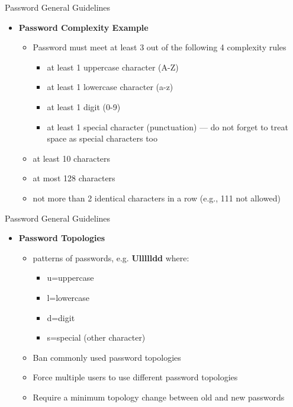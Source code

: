 \documentclass[pdf]{beamer}
\begin{document}
\begin{frame}{Password General Guidelines}
\begin{itemize}
\item
\textbf{Password Complexity Example}
\begin{itemize}
\item
Password must meet at least 3 out of the following 4 complexity rules 

\begin{itemize}
\item
at least 1 uppercase character (A-Z) 
\item
at least 1 lowercase character (a-z) 
\item
at least 1 digit (0-9) 
\item
at least 1 special character (punctuation) — do not forget to treat space as special characters too
\end{itemize}

\item
at least 10 characters 

\item
at most 128 characters

\item
not more than 2 identical characters in a row (e.g., 111 not allowed)
\end{itemize}
\end{itemize}
\end{frame}



\begin{frame}{Password General Guidelines}
\begin{itemize}
\item
\textbf{Password Topologies}
\begin{itemize}
\item
patterns of passwords, e.g. \textbf{Ullllldd} where:
\begin{itemize}
\item
u=uppercase
\item
l=lowercase
\item
d=digit
\item
s=special (other character)
\end{itemize}

\item
Ban commonly used password topologies
\item
Force multiple users to use different password topologies
\item
Require a minimum topology change between old and new passwords
\end{itemize}
\end{itemize}
\end{frame}
\end{document}
